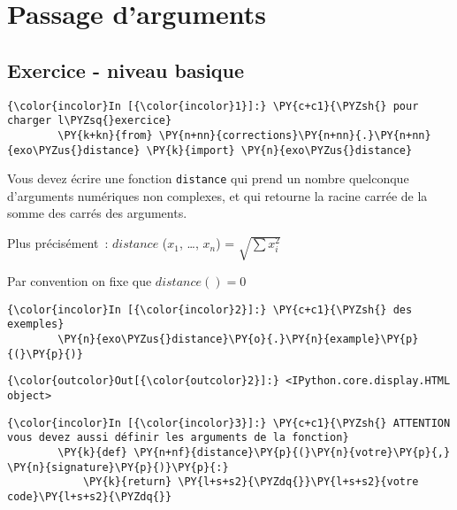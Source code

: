     
    
    
    

    

    \hypertarget{passage-darguments}{%
\section{Passage d'arguments}\label{passage-darguments}}

    \hypertarget{exercice---niveau-basique}{%
\subsection{Exercice - niveau basique}\label{exercice---niveau-basique}}

    \begin{Verbatim}[commandchars=\\\{\}]
{\color{incolor}In [{\color{incolor}1}]:} \PY{c+c1}{\PYZsh{} pour charger l\PYZsq{}exercice}
        \PY{k+kn}{from} \PY{n+nn}{corrections}\PY{n+nn}{.}\PY{n+nn}{exo\PYZus{}distance} \PY{k}{import} \PY{n}{exo\PYZus{}distance}
\end{Verbatim}


    Vous devez écrire une fonction \texttt{distance} qui prend un nombre
quelconque d'arguments numériques non complexes, et qui retourne la
racine carrée de la somme des carrés des arguments.

Plus précisément~: \(distance\) (\(x_1\), \ldots{}, \(x_n\)) =
\(\sqrt{\sum x_i^2}\)

Par convention on fixe que \(distance() = 0\)

    \begin{Verbatim}[commandchars=\\\{\}]
{\color{incolor}In [{\color{incolor}2}]:} \PY{c+c1}{\PYZsh{} des exemples}
        \PY{n}{exo\PYZus{}distance}\PY{o}{.}\PY{n}{example}\PY{p}{(}\PY{p}{)}
\end{Verbatim}


\begin{Verbatim}[commandchars=\\\{\}]
{\color{outcolor}Out[{\color{outcolor}2}]:} <IPython.core.display.HTML object>
\end{Verbatim}
            
    \begin{Verbatim}[commandchars=\\\{\}]
{\color{incolor}In [{\color{incolor}3}]:} \PY{c+c1}{\PYZsh{} ATTENTION vous devez aussi définir les arguments de la fonction}
        \PY{k}{def} \PY{n+nf}{distance}\PY{p}{(}\PY{n}{votre}\PY{p}{,} \PY{n}{signature}\PY{p}{)}\PY{p}{:}
            \PY{k}{return} \PY{l+s+s2}{\PYZdq{}}\PY{l+s+s2}{votre code}\PY{l+s+s2}{\PYZdq{}}
\end{Verbatim}


